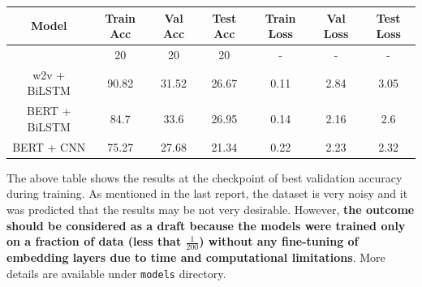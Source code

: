 \documentclass[11pt]{article}
\begin{document}
\begin{center}
  \begin{tabular}{ccccccc}
    \hline
    \textbf{Model} & \textbf{Train Acc} & \textbf{Val Acc} & \textbf{Test Acc} & \textbf{Train Loss} & \textbf{Val Loss} & \textbf{Test Loss} \\
    \hline
    \hline
    [Baseline] & 20 & 20 & 20 & - & - & - \\
    w2v + BiLSTM & 90.82 & 31.52 & 26.67 & 0.11 & 2.84 & 3.05\\
    BERT + BiLSTM & 84.7 & 33.6 & 26.95 & 0.14 & 2.16 & 2.6 \\
    BERT + CNN & 75.27 & 27.68 & 21.34 & 0.22 & 2.23 & 2.32 \\
    \hline
  \end{tabular}
\end{center}

The above table shows the results at the checkpoint of best validation accuracy during training. As mentioned in the last report, the dataset is very noisy and it was predicted that the results may be not very desirable. However, \textbf{the outcome should be considered as a draft because the models were trained only on a fraction of data (less that $ \frac{1}{200} $) without any fine-tuning of embedding layers due to time and computational limitations}. More details are available under \texttt{models} directory.


\end{document}
